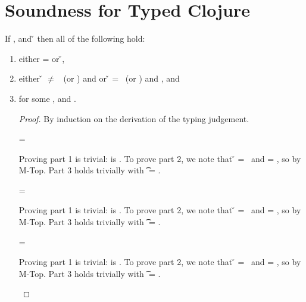 \section{Soundness for Typed Clojure}

\begin{lemma}
If \judgement{\propenv{}}{\hastype{\e{}}{\t{}}}{\filterset{\thenprop{\prop{}}}{\elseprop{\prop{}}}}{\object{}},
\satisfies{\openv{}}{\propenv{}} and \opsem {\openv{}} {\e{}} {\v{}} then all of the following hold:
\begin{enumerate}
  \item either \object{} = \emptyobject{} or \inopenv {\openv{}} {\object{}} {\v{}},
  \item either \v{} $\not=$ \false\ (or \nil) and {\satisfies{\openv{}}{\thenprop{\prop{}}}} or 
               \v{}     = \false\ (or \nil) and {\satisfies{\openv{}}{\elseprop{\prop{}}}}, and
  \item \judgement{}{\hastype{\v{}}{\t{}}}{\filterset{\thenprop{\propp{}}}{\elseprop{\propp{}}}}{\objectp{}}
        for some \thenprop{\propp{}}, \elseprop{\propp{}} and {\objectp{}}.

\begin{proof}
By induction on the derivation of the typing judgement.

\begin{case}[T-True]
\e{} = \true

Proving part 1 is trivial: \object{} is \emptyobject. To prove part 2, we note that \v{} = \true\ 
and \thenprop{\prop{}} = \topprop, so \satisfies{\openv{}}{\thenprop{\prop{}}} by M-Top. Part 3 
holds trivially with \t{} = \True.

\end{case}

\begin{case}[T-False]
\e{} = \false

Proving part 1 is trivial: \object{} is \emptyobject. To prove part 2, we note that \v{} = \false\ 
and \elseprop{\prop{}} = \topprop, so \satisfies{\openv{}}{\elseprop{\prop{}}} by M-Top. Part 3 
holds trivially with \t{} = \False.

\end{case}

\begin{case}[T-Nil]
\e{} = \nil

Proving part 1 is trivial: \object{} is \emptyobject. To prove part 2, we note that \v{} = \nil\ 
and \elseprop{\prop{}} = \topprop, so \satisfies{\openv{}}{\elseprop{\prop{}}} by M-Top. Part 3 
holds trivially with \t{} = \Nil.


\end{case}
\end{proof}
\end{enumerate}
\end{lemma}
